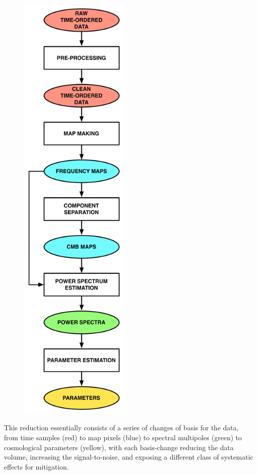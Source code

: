 \begin{figure}[htbp]
\begin{minipage}[h]{0.3\linewidth}
\includegraphics[width=0.475\textwidth]{Analysis/dr}
\end{minipage}
\end{figure}

This reduction essentially consists of a series of changes of basis for the data, from time samples (red) to map pixels (blue) to spectral multipoles (green) to cosmological parameters (yellow), with each basis-change reducing the data volume, increasing the signal-to-noise, and exposing a different class of systematic effects for mitigation.

